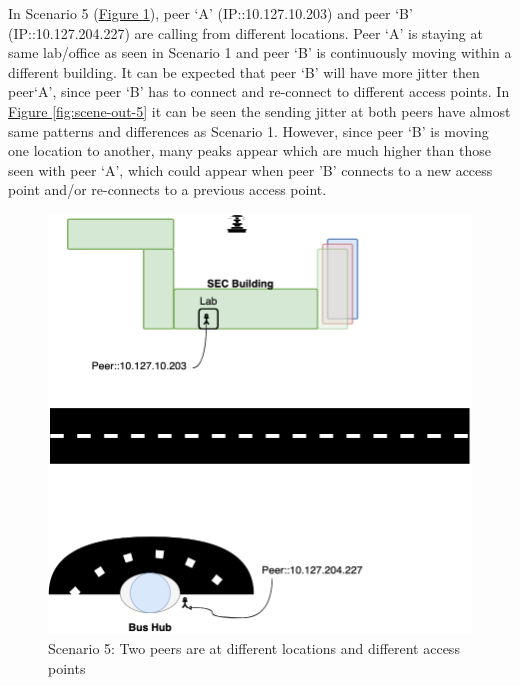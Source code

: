 	In Scenario 5 (\hyperref[fig:scene-5]{Figure \ref{fig:scene-5}}), peer `A' (IP::10.127.10.203) and peer `B' (IP::10.127.204.227) are calling from different locations. Peer `A' is staying at same lab/office as seen in Scenario 1 and peer `B' is continuously moving within a different building. It can be expected that peer `B' will have more jitter then peer`A', since peer `B' has to connect and re-connect to different access points. In \hyperref[fig:scene-out-5]{Figure \ref{fig:scene-out-5}} it can be seen the sending jitter at both peers have almost same patterns and differences as Scenario 1. However, since peer `B' is moving one location to another, many peaks appear which are much higher than those seen with peer `A', which could appear when peer 'B' connects to a new access point and/or re-connects to a previous access point.
	\begin{figure}[tbh]
		\begin{minipage}{\textwidth}
			\includegraphics[scale=0.29]{Images/experiment/senarios/bus_hub.drawio.png}
		\end{minipage}
		\caption{Scenario 5: Two peers are at different locations and different access points}
		\label{fig:scene-5}
	\end{figure}


